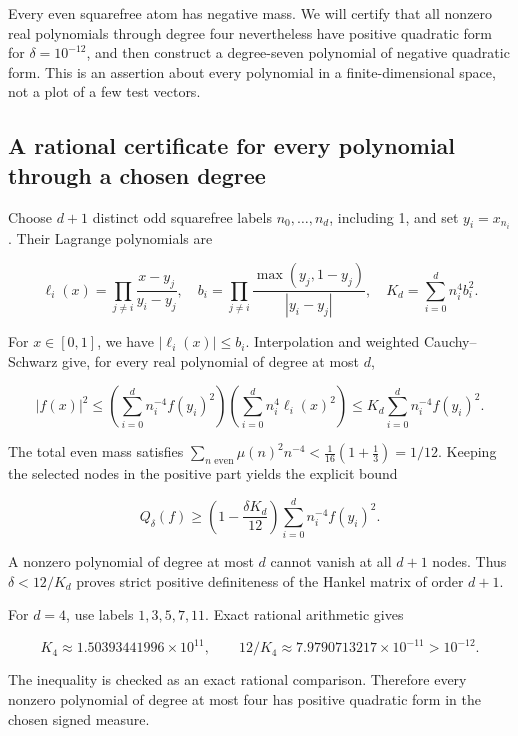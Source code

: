 Every even squarefree atom has negative mass. We will certify that all nonzero real
polynomials through degree four nevertheless have positive quadratic form for
\(\delta=10^{-12}\), and then construct a degree-seven polynomial of
negative quadratic form. This is an assertion about every polynomial in a
finite-dimensional space, not a plot of a few test vectors.

\hypertarget{v11-resolution_full-a-rational-certificate-for-every-polynomial-through-a-chosen-degree}{%
\subsection{A rational certificate for every polynomial through a
chosen
degree}\label{v11-resolution_full-a-rational-certificate-for-every-polynomial-through-a-chosen-degree}}

Choose \(d+1\) distinct odd squarefree labels \(n_0,\ldots,n_d\),
including 1, and set \(y_i=x_{n_i}\). Their Lagrange polynomials are

\[
\ell_i(x)=\prod_{j\ne i}\frac{x-y_j}{y_i-y_j},
\quad
b_i=\prod_{j\ne i}\frac{\max(y_j,1-y_j)}{|y_i-y_j|},
\quad K_d=\sum_{i=0}^{d}n_i^4b_i^2.
\]

For \(x\in[0,1]\), we have \(|\ell_i(x)|\le b_i\). Interpolation and
weighted Cauchy--Schwarz give, for every real polynomial of degree at
most \(d\),

\[
|f(x)|^2\le
\left(\sum_{i=0}^{d}n_i^{-4}f(y_i)^2\right)
\left(\sum_{i=0}^{d}n_i^4\ell_i(x)^2\right)
\le K_d\sum_{i=0}^{d}n_i^{-4}f(y_i)^2.
\]

The total even mass satisfies
\(\sum_{n\text{ even}}\mu(n)^2n^{-4}<\frac1{16}(1+\frac13)=1/12\).
Keeping the selected nodes in the positive part yields the explicit
bound

\[
\boxed{Q_\delta(f)\ge
\left(1-\frac{\delta K_d}{12}\right)
\sum_{i=0}^{d}n_i^{-4}f(y_i)^2.}
\tag{RA-9}
\]

A nonzero polynomial of degree at most \(d\) cannot vanish at all
\(d+1\) nodes. Thus \(\delta<12/K_d\) proves strict positive
definiteness of the Hankel matrix of order \(d+1\).

For \(d=4\), use labels \(1,3,5,7,11\). Exact rational arithmetic gives

\[
K_4\approx1.50393441996\times10^{11},\qquad
12/K_4\approx7.9790713217\times10^{-11}>10^{-12}.
\]

The inequality is checked as an exact rational comparison. Therefore
every nonzero polynomial of degree at most four has positive quadratic form in the
chosen signed measure.

